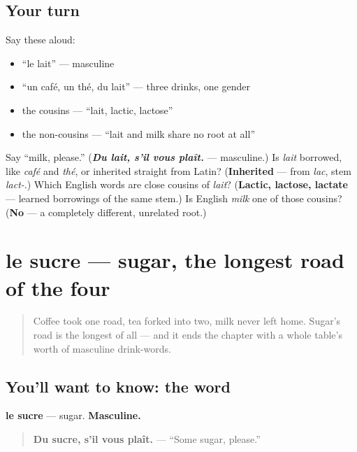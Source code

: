 \subsection*{Your turn}
Say these aloud:

\begin{itemize}
\raggedright
  \item \textquotedblleft{}le lait\textquotedblright{} — masculine
  \item \textquotedblleft{}un café, un thé, du lait\textquotedblright{} — three drinks, one gender
  \item the cousins — \textquotedblleft{}lait, lactic, lactose\textquotedblright{}
  \item the non-cousins — \textquotedblleft{}lait and milk share no root at all\textquotedblright{}
\end{itemize}

\begin{tcolorbox}[breakable,colback=teal!4,colframe=teal!35!black,title={Before you move on}]
Say \textquotedblleft{}milk, please.\textquotedblright{} (\emph{\textbf{Du lait, s'il vous plaît.}} — masculine.) Is \emph{lait} borrowed, like \emph{café} and \emph{thé}, or inherited straight from Latin? (\textbf{Inherited} — from \emph{lac}, stem \emph{lact-}.) Which English words are close cousins of \emph{lait}? (\textbf{Lactic, lactose, lactate} — learned borrowings of the same stem.) Is English \emph{milk} one of those cousins? (\textbf{No} — a completely different, unrelated root.)
\end{tcolorbox}
\section[le sucre]{le sucre — sugar, the longest road of the four}

\label{lesson:FR-C28-sucre}



\begin{quote}
Coffee took one road, tea forked into two, milk never left home. Sugar's road is the longest of all — and it ends the chapter with a whole table's worth of masculine drink-words.
\end{quote}

\subsection*{You'll want to know: the word}
\textbf{le sucre} — sugar. \textbf{Masculine.}

\begin{quote}
\textbf{Du sucre, s'il vous plaît.} — \textquotedblleft{}Some sugar, please.\textquotedblright{}
\end{quote}

